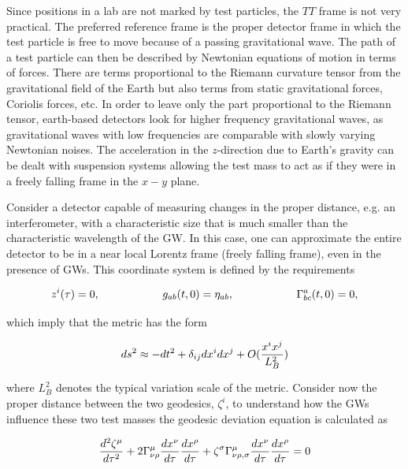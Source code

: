 \documentclass[binding=0.6cm, LaM]{sapthesis}
\begin{document}
	Since positions in a lab are not marked by test particles,  
	the $TT$ frame is not very practical. 
	The preferred reference frame is the proper detector frame 
	in which the test particle is free to move because of a passing gravitational wave. 
	The path of a test particle can then be described by Newtonian equations of motion in terms of forces. 
	There are terms proportional to the Riemann curvature tensor from the gravitational field of the Earth 
	but also terms from static gravitational forces, Coriolis forces, etc. 
	In order to leave only the part proportional to the Riemann tensor, 
	earth-based detectors look for higher frequency gravitational waves, 
	as gravitational waves with low frequencies are comparable with slowly varying Newtonian noises. 
	The acceleration in the $z$-direction due to Earth’s gravity can be dealt with suspension systems 
	allowing the test mass to act as if they were in a freely falling frame in the $x - y$ plane. 

	Consider a detector capable of measuring changes in the proper distance, e.g. an interferometer, 
	with a characteristic size that is much smaller than the characteristic wavelength of the GW.
	In this case, one can approximate the entire detector to be in a near local Lorentz frame  
	(freely falling frame), even in the presence of GWs. This coordinate system is defined by the requirements

		\begin{equation}
		z^i(\tau) = 0, \hspace*{2cm} g_{ab}(t, 0) = \eta_{ab}, \hspace*{2cm} \Gamma^a_{bc}(t,0) = 0,
		\end{equation}

	which imply that the metric has the form

		\begin{equation}
		ds^2 \approx -dt^2 + \delta_{ij}dx^i dx^j + O({{x^ix^j}\over{L^2_B}})
		\end{equation}

	where $L^2_B$ denotes the typical variation scale of the metric.
	Consider now the proper distance between the two geodesics, $\zeta^i$, 
	to understand how the GWs influence these two test masses the geodesic deviation equation is calculated as

		\begin{equation}
		{{d^2\zeta^{\mu}}\over{d\tau^2}} + 2\Gamma^{\mu}_{\nu\rho}{{dx^{\nu}}\over{d\tau}}{{dx^\rho}\over{d\tau}} + \zeta^{\sigma}\Gamma^{\mu}_{\nu\rho,\sigma}{{dx^{\nu}}\over{d\tau}}{{dx^{\rho}}\over{d\tau}} = 0
		\end{equation}
\end{document}
